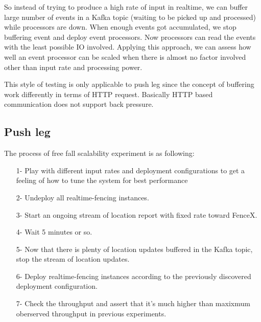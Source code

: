 \documentclass[a4]{report}
\begin{document}
    So instead of trying to produce a high rate of input in realtime, we can buffer large number of events in a Kafka
    topic (waiting to be picked up and processed) while processors are down.
    When enough events got accumulated, we stop buffering event and deploy event processors.
    Now processors can read the events with the least possible IO involved.
    Applying this approach, we can assess how well an event processor can be scaled when there is almost no factor
    involved other than input rate and processing power.

    This style of testing is only applicable to push leg since the concept of buffering work differently in terms of
    HTTP request.
    Basically HTTP based communication does not support back pressure.

    \subsection{Push leg}
    The process of free fall scalability experiment is as following:
    \begin{itemize}
        \item[1-] Play with different input rates and deployment configurations to get a feeling of how to tune the
        system for best performance
        \item[2-] Undeploy all realtime-fencing instances.
        \item[3-] Start an ongoing stream of location report with fixed rate toward FenceX.
        \item[4-] Wait 5 minutes or so.
        \item[5-] Now that there is plenty of location updates buffered in the Kafka topic, stop the stream of
        location updates.
        \item[6-] Deploy realtime-fencing instances according to the previously discovered deployment configuration.
        \item[7-] Check the throughput and assert that it's much higher than maxixmum oberserved throughput in
        previous experiments.
    \end{itemize}

    \clearpage
\end{document}
